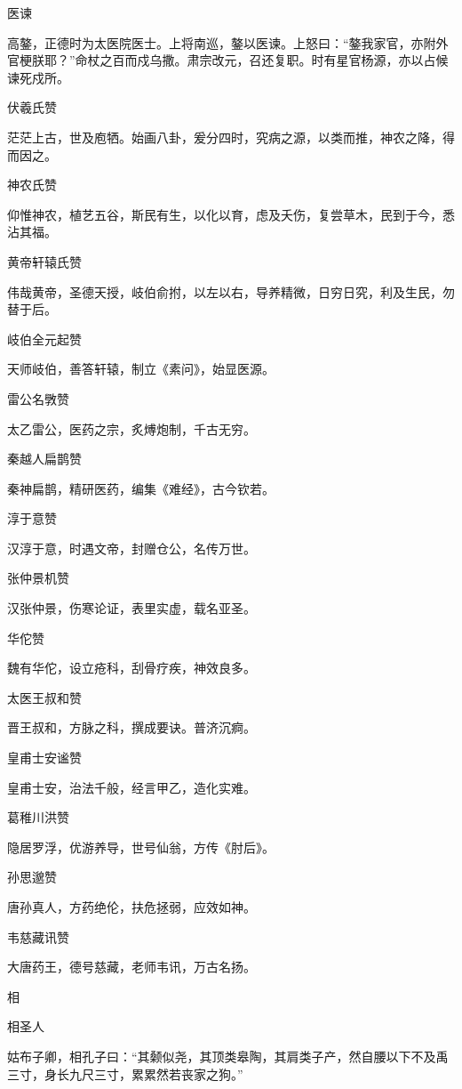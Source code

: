 \documentclass[a4paper,12pt,UTF8,twoside]{ctexbook}
\begin{document}
    医谏
    
    高鏊，正德时为太医院医士。上将南巡，鏊以医谏。上怒曰：“鏊我家官，亦附外官梗朕耶？”命杖之百而戍乌撒。肃宗改元，召还复职。时有星官杨源，亦以占候谏死戍所。
    
    伏羲氏赞
    
    茫茫上古，世及庖牺。始画八卦，爰分四时，究病之源，以类而推，神农之降，得而因之。
    
    神农氏赞
    
    仰惟神农，植艺五谷，斯民有生，以化以育，虑及夭伤，复尝草木，民到于今，悉沾其福。
    
    黄帝轩辕氏赞
    
    伟哉黄帝，圣德天授，岐伯俞拊，以左以右，导养精微，日穷日究，利及生民，勿替于后。
    
    岐伯全元起赞
    
    天师岐伯，善答轩辕，制立《素问》，始显医源。
    
    雷公名斆赞
    
    太乙雷公，医药之宗，炙煿炮制，千古无穷。
    
    秦越人扁鹊赞
    
    秦神扁鹊，精研医药，编集《难经》，古今钦若。
    
    淳于意赞
    
    汉淳于意，时遇文帝，封赠仓公，名传万世。
    
    张仲景机赞
    
    汉张仲景，伤寒论证，表里实虚，载名亚圣。
    
    华佗赞
    
    魏有华佗，设立疮科，刮骨疗疾，神效良多。
    
    太医王叔和赞
    
    晋王叔和，方脉之科，撰成要诀。普济沉痾。
    
    皇甫士安谧赞
    
    皇甫士安，治法千般，经言甲乙，造化实难。
    
    葛稚川洪赞
    
    隐居罗浮，优游养导，世号仙翁，方传《肘后》。
    
    孙思邈赞
    
    唐孙真人，方药绝伦，扶危拯弱，应效如神。
    
    韦慈藏讯赞
    
    大唐药王，德号慈藏，老师韦讯，万古名扬。
    
    相
    
    相圣人
    
    姑布子卿，相孔子曰：“其颡似尧，其顶类皋陶，其肩类子产，然自腰以下不及禹三寸，身长九尺三寸，累累然若丧家之狗。”
    
\end{document}
